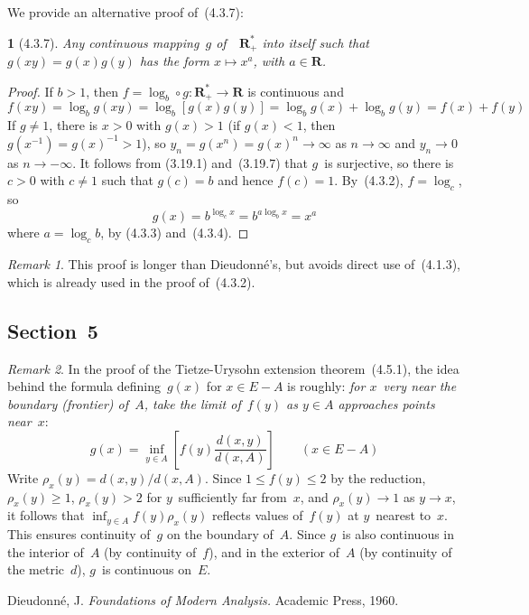 \documentclass[letterpaper,12pt]{article}
\newcommand{\R}{\mathbf{R}}
\newcommand{\Rp}{\R_+}
\newcommand{\Rps}{\Rp^*}
\newcommand{\after}{\circ}
\newcommand{\inv}[1]{#1^{-1}}
\theoremstyle{plain}
\newtheorem*{prop}{}
\theoremstyle{definition}
\theoremstyle{remark}
\newtheorem*{rmk}{Remark}
\begin{document}
\noindent We provide an alternative proof of~(4.3.7):
\begin{prop}[4.3.7]
Any continuous mapping~\(g\) of~~\(\Rps\) into itself such that \(g(xy)=g(x)g(y)\) has the form \(x\mapsto x^a\), with \(a\in\R\).
\end{prop}
\begin{proof}
If \(b>1\), then \(f=\log_b\after g:\Rps\to\R\) is continuous and
\[f(xy)=\log_b g(xy)=\log_b[g(x)g(y)]=\log_b g(x)+\log_b g(y)=f(x)+f(y)\]
If \(g\ne1\), there is \(x>0\) with \(g(x)>1\) (if \(g(x)<1\), then \(g(\inv{x})=\inv{g(x)}>1\)), so \(y_n=g(x^n)=g(x)^n\to\infty\) as \(n\to\infty\) and \(y_n\to 0\) as \(n\to-\infty\). It follows from (3.19.1) and~(3.19.7) that \(g\)~is surjective, so there is \(c>0\) with \(c\ne 1\) such that \(g(c)=b\) and hence \(f(c)=1\). By~(4.3.2), \(f=\log_c\), so
\[g(x)=b^{\log_c x}=b^{a\log_b x}=x^a\]
where \(a=\log_c b\), by (4.3.3) and~(4.3.4).
\end{proof}
\begin{rmk}
This proof is longer than Dieudonn\'e's, but avoids direct use of~(4.1.3), which is already used in the proof of~(4.3.2).
\end{rmk}

\subsection*{Section~5}
\begin{rmk}
In the proof of the Tietze-Urysohn extension theorem~(4.5.1), the idea behind the formula defining~\(g(x)\) for \(x\in E-A\) is roughly: \emph{for \(x\)~very near the boundary (frontier) of~\(A\), take the limit of~\(f(y)\) as \(y\in A\) approaches points near~\(x\)}:
\[g(x)=\inf_{y\in A}\left[f(y)\frac{d(x,y)}{d(x,A)}\right]\qquad(x\in E-A)\]
Write \(\rho_x(y)=d(x,y)/d(x,A)\). Since \(1\le f(y)\le 2\) by the reduction, \(\rho_x(y)\ge 1\), \(\rho_x(y)>2\) for \(y\)~sufficiently far from~\(x\), and \(\rho_x(y)\to 1\) as \(y\to x\), it follows that \(\inf_{y\in A}f(y)\rho_x(y)\) reflects values of~\(f(y)\) at \(y\)~nearest to~\(x\). This ensures continuity of~\(g\) on the boundary of~\(A\). Since \(g\)~is also continuous in the interior of~\(A\) (by continuity of~\(f\)), and in the exterior of~\(A\) (by continuity of the metric~\(d\)), \(g\)~is continuous on~\(E\).
\end{rmk}

\begin{thebibliography}{0}
 Dieudonn\'e, J. \textit{Foundations of Modern Analysis.} Academic Press, 1960.
\end{thebibliography}
\end{document}
